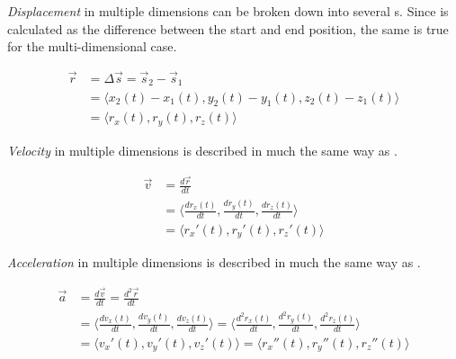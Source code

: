 \begin{definition}\label{Multi-D Displacement}
  \emph{Displacement} in multiple dimensions can be broken down into several s.
  Since  is calculated as the difference between the start and end position, the same is true for the multi-dimensional case.

  \begin{equation}\label{eq:Multi-D Displacement}
    \begin{aligned}
      \vec{r} &= \Delta \vec{s} = \vec{s}_{2} - \vec{s}_{1} \\
      &= \bigl\langle x_{2}(t)-x_{1}(t), y_{2}(t)-y_{1}(t), z_{2}(t)-z_{1}(t) \bigr\rangle \\
      &= \bigl\langle r_{x}(t), r_{y}(t), r_{z}(t) \bigr\rangle
    \end{aligned}
  \end{equation}
\end{definition}

\begin{definition}\label{Multi-D Velocity}
  \emph{Velocity} in multiple dimensions is described in much the same way as .

  \begin{equation}\label{eq:Multi-D Velocity}
    \begin{aligned}
      \vec{v} &= \frac{d \vec{r}}{dt} \\
      &= \biggl \langle \frac{d r_{x}(t)}{dt}, \frac{d r_{y}(t)}{dt}, \frac{d r_{z}(t)}{dt} \biggr \rangle \\
      &= \bigl \langle r_{x}'(t), r_{y}'(t), r_{z}'(t) \bigr \rangle
    \end{aligned}
  \end{equation}
\end{definition}

\begin{definition}\label{Multi-D Acceleration}
  \emph{Acceleration} in multiple dimensions is described in much the same way as .

  \begin{equation}\label{eq:Multi-D Acceleration}
    \begin{aligned}
      \vec{a} &= \frac{d \vec{v}}{dt} = \frac{d^{2} \vec{r}}{dt} \\
      &= \biggl \langle \frac{d v_{x}(t)}{dt}, \frac{d v_{y}(t)}{dt}, \frac{d v_{z}(t)}{dt} \biggr \rangle = \biggl \langle \frac{d^{2} r_{x}(t)}{dt}, \frac{d^{2} r_{y}(t)}{dt}, \frac{d^{2} r_{z}(t)}{dt} \biggr \rangle \\
      &= \bigl \langle v_{x}'(t), v_{y}'(t), v_{z}'(t) \bigr \rangle = \bigl \langle r_{x}''(t), r_{y}''(t), r_{z}''(t) \bigr \rangle
    \end{aligned}
  \end{equation}
\end{definition}

